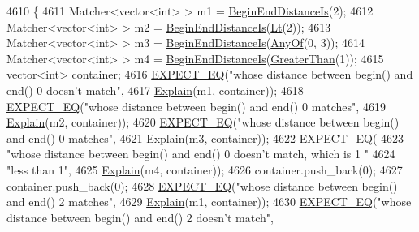 \begin{DoxyCode}
4610                                              \{
4611   Matcher<vector<int> > m1 = \hyperlink{namespacetesting_a122739b5b6bd9f993f26800dafdb4cc3}{BeginEndDistanceIs}(2);
4612   Matcher<vector<int> > m2 = \hyperlink{namespacetesting_a122739b5b6bd9f993f26800dafdb4cc3}{BeginEndDistanceIs}(\hyperlink{namespacetesting_ad621459957a8bcdd3c256b7940ecbf99}{Lt}(2));
4613   Matcher<vector<int> > m3 = \hyperlink{namespacetesting_a122739b5b6bd9f993f26800dafdb4cc3}{BeginEndDistanceIs}(\hyperlink{namespacetesting_a81cfefd9f75cdce827d5bc873cf73aac}{AnyOf}(0, 3));
4614   Matcher<vector<int> > m4 = \hyperlink{namespacetesting_a122739b5b6bd9f993f26800dafdb4cc3}{BeginEndDistanceIs}(\hyperlink{namespacetesting_1_1gmock__matchers__test_a8cf8614a7c9adc8fb00e8af04895f97c}{GreaterThan}(1));
4615   vector<int> container;
4616   \hyperlink{gtest_8h_a4159019abda84f5366acdb7604ff220a}{EXPECT\_EQ}(\textcolor{stringliteral}{"whose distance between begin() and end() 0 doesn't match"},
4617             \hyperlink{namespacetesting_1_1gmock__matchers__test_a6215aeb6213a03f4233924ef1c74d968}{Explain}(m1, container));
4618   \hyperlink{gtest_8h_a4159019abda84f5366acdb7604ff220a}{EXPECT\_EQ}(\textcolor{stringliteral}{"whose distance between begin() and end() 0 matches"},
4619             \hyperlink{namespacetesting_1_1gmock__matchers__test_a6215aeb6213a03f4233924ef1c74d968}{Explain}(m2, container));
4620   \hyperlink{gtest_8h_a4159019abda84f5366acdb7604ff220a}{EXPECT\_EQ}(\textcolor{stringliteral}{"whose distance between begin() and end() 0 matches"},
4621             \hyperlink{namespacetesting_1_1gmock__matchers__test_a6215aeb6213a03f4233924ef1c74d968}{Explain}(m3, container));
4622   \hyperlink{gtest_8h_a4159019abda84f5366acdb7604ff220a}{EXPECT\_EQ}(
4623       \textcolor{stringliteral}{"whose distance between begin() and end() 0 doesn't match, which is 1 "}
4624       \textcolor{stringliteral}{"less than 1"},
4625       \hyperlink{namespacetesting_1_1gmock__matchers__test_a6215aeb6213a03f4233924ef1c74d968}{Explain}(m4, container));
4626   container.push\_back(0);
4627   container.push\_back(0);
4628   \hyperlink{gtest_8h_a4159019abda84f5366acdb7604ff220a}{EXPECT\_EQ}(\textcolor{stringliteral}{"whose distance between begin() and end() 2 matches"},
4629             \hyperlink{namespacetesting_1_1gmock__matchers__test_a6215aeb6213a03f4233924ef1c74d968}{Explain}(m1, container));
4630   \hyperlink{gtest_8h_a4159019abda84f5366acdb7604ff220a}{EXPECT\_EQ}(\textcolor{stringliteral}{"whose distance between begin() and end() 2 doesn't match"},

\end{DoxyCode}
